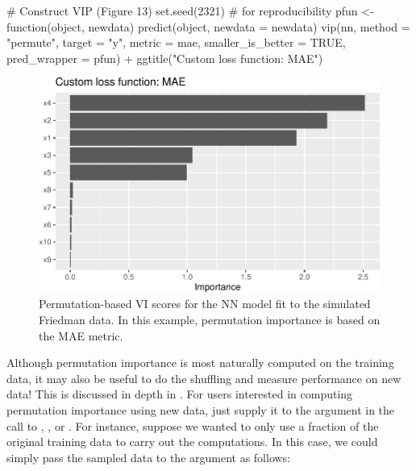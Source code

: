 \begin{Schunk}
\begin{Sinput}
# Construct VIP (Figure 13)
set.seed(2321)  # for reproducibility
pfun <- function(object, newdata)  predict(object, newdata = newdata)
vip(nn, method = "permute", target = "y", metric = mae,
    smaller_is_better = TRUE, pred_wrapper = pfun) +
  ggtitle("Custom loss function: MAE")
\end{Sinput}
\begin{figure}[!htb]

{\centering \includegraphics[width=0.7\linewidth]{greenwell-boehmke_files/figure-latex/vip-nn-mae-1}

}

\caption[Permutation-based VI scores for the NN model fit to the simulated Friedman data]{Permutation-based VI scores for the NN model fit to the simulated Friedman data. In this example, permutation importance is based on the MAE metric.}\label{fig:vip-nn-mae}
\end{figure}
\end{Schunk}

Although permutation importance is most naturally computed on the
training data, it may also be useful to do the shuffling and measure
performance on new data! This is discussed in depth in
\citet[sec. 5.2]{molnar-2019-iml}. For users interested in computing
permutation importance using new data, just supply it to the
 argument in the call to , , or
. For instance, suppose we wanted to only use a
fraction of the original training data to carry out the computations. In
this case, we could simply pass the sampled data to the 
argument as follows:

